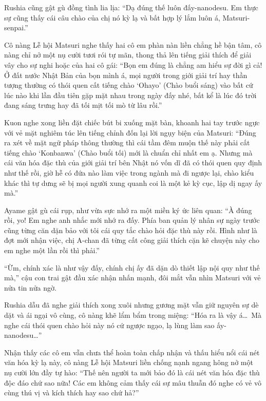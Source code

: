 \documentclass[../main.tex]{subfiles}
\begin{document}

Rushia cũng gật gù đồng tình lia lịa: ``Dạ đúng thế luôn đấy-nanodesu. Em thực sự cũng thấy cái câu chào của chị nó kỳ lạ và bất hợp lý lắm luôn á, Matsuri-senpai.''

Cô nàng Lễ hội Matsuri nghe thấy hai cô em phàn nàn liền chẳng hề bận tâm, cô nàng chỉ nở một nụ cười tươi rói tự mãn, thong thả lên tiếng giải thích để giải vây cho sự nghi hoặc của hai cô gái: ``Bọn em đúng là chẳng am hiểu sự đời gì cả! Ở đất nước Nhật Bản của bọn mình á, mọi người trong giới giải trí hay thần tượng thường có thói quen cất tiếng chào `Ohayo' (Chào buổi sáng) vào bất cứ lúc nào khi lần đầu tiên gặp mặt nhau trong ngày đấy nhé, bất kể là lúc đó trời đang sáng trưng hay đã tối mịt tối mò từ lâu rồi.''

Kuon nghe xong liền đặt chiếc bút bi xuống mặt bàn, khoanh hai tay trước ngực với vẻ mặt nghiêm túc lên tiếng chỉnh đốn lại lời ngụy biện của Matsuri: ``Đúng ra xét về mặt ngữ pháp thông thường thì cái tầm đêm muộn thế này phải cất tiếng chào `Konbanwa' (Chào buổi tối) mới là chuẩn chỉ nhất em ạ. Nhưng mà cái văn hóa đặc thù của giới giải trí bên Nhật nó vốn dĩ đã có thói quen quy định như thế rồi, giờ hễ có đứa nào làm việc trong ngành mà đi ngược lại, chào kiểu khác thì tự dưng sẽ bị mọi người xung quanh coi là một kẻ kỳ cục, lập dị ngay ấy mà.''

Ayame gật gù cái rụp, như vừa sực nhớ ra một miền ký ức liên quan: ``À đúng rồi, yo! Em nghe anh nhắc mới nhớ ra đấy. Phía ban quản lý nhân sự ngày trước cũng từng căn dặn bảo với tôi cái quy tắc chào hỏi đặc thù này rồi. Hình như là đợt mới nhận việc, chị A-chan đã từng cất công giải thích cặn kẽ chuyện này cho em nghe một lần rồi thì phải.''

``Ừm, chính xác là như vậy đấy, chính chị ấy đã dặn dò thiết lập nội quy như thế mà,'' cậu con trai gật đầu xác nhận nhấn mạnh, đôi mắt vẫn nhìn Matsuri với vẻ nửa tin nửa ngờ.


Rushia dẫu đã nghe giải thích xong xuôi nhưng gương mặt vẫn giữ nguyên sự dè dặt và ái ngại vô cùng, cô nàng khẽ lẩm bẩm trong miệng: ``Hóa ra là vậy á\dots\ Mà nghe cái thói quen chào hỏi này nó cứ ngược ngạo, lạ lùng làm sao ấy-nanodesu\dots''

Nhận thấy các cô em vẫn chưa thể hoàn toàn chấp nhận và thấu hiểu nổi cái nét văn hóa kỳ lạ này, cô nàng Lễ hội Matsuri liền chống nạnh ngang hông nở một nụ cười lớn đầy tự hào: ``Thế nên người ta mới bảo đó là cái nét văn hóa đặc thù độc đáo chứ sao nữa! Các em không cảm thấy cái sự mâu thuẫn đó nghe có vẻ vô cùng thú vị và kích thích hay sao chứ hả?''
\end{document}
